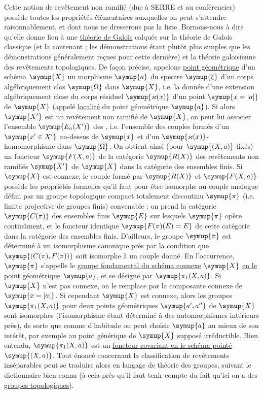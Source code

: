 Cette notion de revêtement non ramifié (due à SERRE et au conférencier) possède
toutes les propriétés élémentaires auxquelles on peut s'attendre
raisonnablement, et dont nous ne dresserons pas la liste. Bornons-nous à dire
qu'elle donne lieu à une \uline{théorie de Galois} calquée sur la théorie de Galois
classique (et la contenant ; les démonstrations étant plutôt plus simples que
les démonstrations généralement reçues pour cette dernière) et la théorie
galoisienne des revêtements topologiques. De façon précise, appelons
\uline{point géométrique} d'un schéma $\symup{X}$ un morphisme $\symup{a}$ du spectre $\symup{\xi}$
d'un corps algébriquement clos $\symup{\Omega}$ dans $\symup{X}$, i.e. la donnée d'une
extension algébriquement close du corps résiduel $\symup{\varkappa(x)}$ d'un point
$\symup{x=|a|}$ de $\symup{X}$ (appelé \uline{localité} du point géométrique $\symup{a}$). Si alors
$\symup{X'}$ est un revêtement non ramifié de $\symup{X}$, on peut lui associer l'ensemble
$\symup{E_a(X')}$ des , i.e.
l'ensemble des couples formés d'un $\symup{x'\in X'}$ au-dessus de $\symup{x}$ et d'un
$\symup{\varkappa(x)}$-homomorphisme dans $\symup{\Omega}$. On obtient ainsi
(pour $\symup{(X,a)}$ fixés) un foncteur $\symup{F(X,a)}$ de la catégorie $\symup{R(X)}$ des
revêtements non ramifiés $\symup{X'}$ de $\symup{X}$ dans la catégorie des ensembles finis. Si
$\symup{X}$ est connexe, le couple formé par $\symup{R(X)}$ et $\symup{F(X,a)}$ possède les propriétés
formelles qu'il faut pour être isomorphe au couple analogue défini par un
groupe topologique compact totalement discontinu $\symup{\pi}$ (i.e. limite projective
de groupes finis) convenable : on prend la catégorie $\symup{C(\pi)}$ des ensembles
finis $\symup{E}$ sur lesquels $\symup{\pi}$ opère continûment, et le foncteur identique
$\symup{F(\pi)(E)=E}$ de cette catégorie dans la catégorie des ensembles finis.
D'ailleurs, le groupe $\symup{\pi}$ est déterminé à un isomorphisme canonique près par
la condition que $\symup{(C(\pi),F(\pi))}$ soit isomorphe à un couple donné. En
l'occurrence, $\symup{\pi}$ s'appelle le \uline{groupe fondamental du schéma connexe}
$\symup{X}$ \uline{en le point géométrique} $\symup{a}$, et se désigne par $\symup{\pi_1(X,a)}$. Si $\symup{X}$ n'est
pas connexe, on le remplace par la composante connexe de $\symup{x=|a|}$. Si cependant
$\symup{X}$ est connexe, alors les groupes $\symup{\pi_1(X,a)}$ pour deux points géométriques
$\symup{a',a''}$ de $\symup{X}$ sont isomorphes (l'isomorphisme étant déterminé à des
automorphismes intérieurs près), de sorte que comme d'habitude on peut choisir
$\symup{a}$ au mieux de son intérêt, par exemple au point générique de
$\symup{X}$ supposé irréductible. Bien entendu, $\symup{\pi_1(X,a)}$ est un \uline{foncteur covariant en le schéma pointé} $\symup{(X,a)}$. Tout énoncé concernant la classification de
revêtements inséparables peut se traduire alors en langage de théorie des groupes,
suivant le dictionnaire bien connu (à cela près qu'il faut tenir compte du fait
qu'ici on a des \uline{groupes topologiques}).

